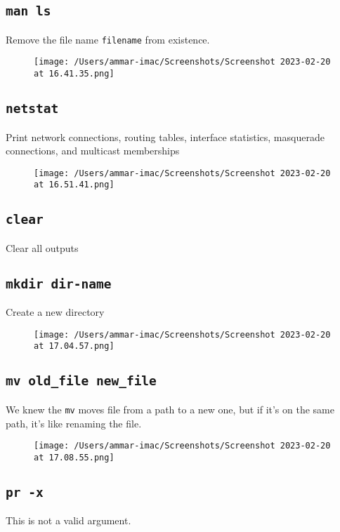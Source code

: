 \documentclass{article}
\def\code#1{\texttt{#1}}
\begin{document}
\subsection{\code{man ls}}%
Remove the file name \code{filename} from existence.
\begin{figure}[ht]
  \centering
  \texttt{[image: /Users/ammar-imac/Screenshots/Screenshot 2023-02-20 at 16.41.35.png]}
\end{figure}

\subsection{\code{netstat}}%
Print  network  connections, routing tables, interface statistics, masquerade connections, and multicast memberships
\begin{figure}[ht]
  \centering
  \texttt{[image: /Users/ammar-imac/Screenshots/Screenshot 2023-02-20 at 16.51.41.png]}
\end{figure}

\newpage

\subsection{\code{clear}}%
Clear all outputs

\subsection{\code{mkdir dir-name}}%
Create a new directory
\begin{figure}[ht]
  \centering
  \texttt{[image: /Users/ammar-imac/Screenshots/Screenshot 2023-02-20 at 17.04.57.png]}
\end{figure}


\subsection{\code{mv old\_file new\_file}}%
We knew the \code{mv} moves file from a path to a new one, but if it's on the same path, it's like renaming
the file.
\begin{figure}[ht]
  \centering
  \texttt{[image: /Users/ammar-imac/Screenshots/Screenshot 2023-02-20 at 17.08.55.png]}
\end{figure}


\subsection{\code{pr -x}}%
This is not a valid argument.
\end{document}
